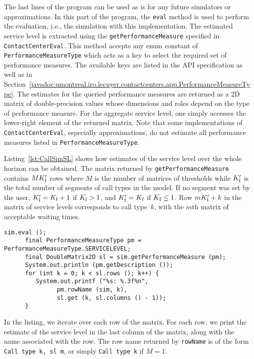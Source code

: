 The last lines of the program can be used as is for
any future simulators or
approximations.
In this part of the program, the \texttt{eval} method is used to perform
the evaluation, i.e., the simulation with this implementation.  The
estimated
service level is extracted using the \texttt{get\-Performance\-Measure}
specified in \texttt{Contact\-Center\-Eval}.  This method accepts any
enum constant of \texttt{Performance\-Measure\-Type} which acts as a
key to select the required set of performance measures.  The available
keys are listed in the API specification as well as in
Section~\ref{javadoc:umontreal.iro.lecuyer.contactcenters.app.PerformanceMeasureType}.
The estimates for the queried performance
measures are returned as a 2D matrix of double-precision values whose
dimensions and roles depend on the type of performance measure.    For
the aggregate service level, one
simply accesses the lower-right element of the returned matrix.
Note that some implementations of
\texttt{Contact\-Center\-Eval}, especially approximations, do not
estimate all performance measures listed in
\texttt{Performance\-Measure\-Type}.

Listing~\ref{lst:CallSimSL} shows how estimates of the service level
over the whole horizon can be obtained.
The matrix returned by \texttt{get\-Performance\-Measure} contains
$MK_{\mathrm{I}}'$ rows where $M$ is the number of matrices of thresholds while $K_{\mathrm{I}}'$
is the total number of segments of call types in the model.
If no segment was set by the user, $K_{\mathrm{I}}'=K_{\mathrm{I}}+1$ if $K_{\mathrm{I}}>1$, and $K_{\mathrm{I}}'=K_{\mathrm{I}}$ if
$K_{\mathrm{I}}\le 1$.
Row $mK_{\mathrm{I}}'+k$ in the matrix of service levels corresponds to
call type~$k$, with the $m$th matrix of acceptable waiting times.

\begin{lstlisting}[caption={Part of \texttt{CallSimSL.java}: obtaining
    service level estimates for each call type and acceptable waiting
    time},label=lst:CallSimSL]
      sim.eval ();
      final PerformanceMeasureType pm = PerformanceMeasureType.SERVICELEVEL;
      final DoubleMatrix2D sl = sim.getPerformanceMeasure (pm);
      System.out.println (pm.getDescription ());
      for (int k = 0; k < sl.rows (); k++) {
         System.out.printf ("%s: %.3f%n",
               pm.rowName (sim, k),
               sl.get (k, sl.columns () - 1));
      }
\end{lstlisting}

In the listing, we iterate over each row of the matrix. For each row,
we print the estimate of the service level in the last column of the
matrix, along with the name associated with the row.
The row name returned by \texttt{row\-Name} is of the form
\texttt{Call type k, sl m}, or simply \texttt{Call type k} if $M=1$.

